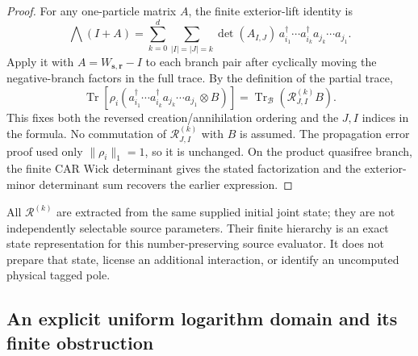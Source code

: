 \documentclass[12pt,a4paper]{article}
\begin{document}
\begin{proof}
For any one-particle matrix $A$, the finite exterior-lift identity is
\[
 \bigwedge(I+A)
 =\sum_{k=0}^d\sum_{|I|=|J|=k}
 \det(A_{I,J})\,
 a_{i_1}^\dagger\cdots a_{i_k}^\dagger
                       a_{j_k}\cdots a_{j_1}.
\]
Apply it with $A=W_{\mathbf s,\mathbf r}-I$ to each branch pair after
cyclically moving the negative-branch factors in the full trace. By the
definition of the partial trace,
\[
 \operatorname{Tr}\!\left[\rho_i
 \left(a_{i_1}^\dagger\cdots a_{i_k}^\dagger
       a_{j_k}\cdots a_{j_1}\otimes B\right)\right]
 =\operatorname{Tr}_{\mathcal B}(\mathcal R^{(k)}_{J,I}B).
\]
This fixes both the reversed creation/annihilation ordering and the
$J,I$ indices in the formula. No commutation of $\mathcal R^{(k)}_{J,I}$
with $B$ is assumed. The propagation error proof used only
$\|\rho_i\|_1=1$, so it is unchanged. On the product quasifree branch,
the finite CAR Wick determinant gives the stated factorization and the
exterior-minor determinant sum recovers the earlier expression.
\end{proof}

All $\mathcal R^{(k)}$ are extracted from the same supplied initial joint
state; they are not independently selectable source parameters. Their
finite hierarchy is an exact state representation for this number-preserving
source evaluator. It does not prepare that state, license an additional
interaction, or identify an uncomputed physical tagged pole.







\subsection{An explicit uniform logarithm domain and its finite obstruction}
\label{p4:sec:v249-certified-log-domain}
\end{document}

